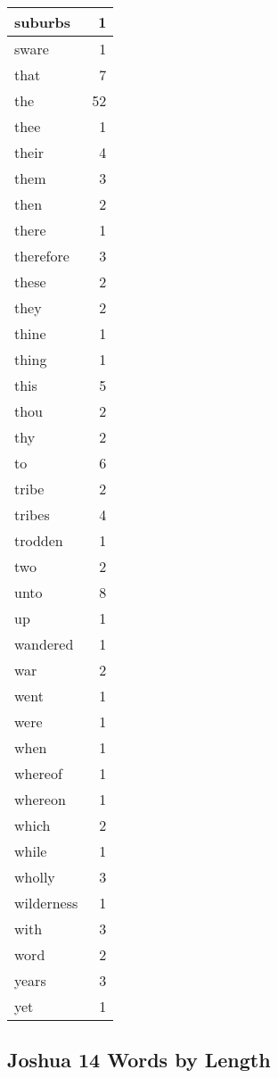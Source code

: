 \begin{center}
\begin{longtable}{l|r}
suburbs & 1\\ \hline 
sware & 1\\ \hline 
that & 7\\ \hline 
the & 52\\ \hline 
thee & 1\\ \hline 
their & 4\\ \hline 
them & 3\\ \hline 
then & 2\\ \hline 
there & 1\\ \hline 
therefore & 3\\ \hline 
these & 2\\ \hline 
they & 2\\ \hline 
thine & 1\\ \hline 
thing & 1\\ \hline 
this & 5\\ \hline 
thou & 2\\ \hline 
thy & 2\\ \hline 
to & 6\\ \hline 
tribe & 2\\ \hline 
tribes & 4\\ \hline 
trodden & 1\\ \hline 
two & 2\\ \hline 
unto & 8\\ \hline 
up & 1\\ \hline 
wandered & 1\\ \hline 
war & 2\\ \hline 
went & 1\\ \hline 
were & 1\\ \hline 
when & 1\\ \hline 
whereof & 1\\ \hline 
whereon & 1\\ \hline 
which & 2\\ \hline 
while & 1\\ \hline 
wholly & 3\\ \hline 
wilderness & 1\\ \hline 
with & 3\\ \hline 
word & 2\\ \hline 
years & 3\\ \hline 
yet & 1\\ \hline 
\end{longtable}
\end{center}





\subsection{Joshua 14 Words by Length}


